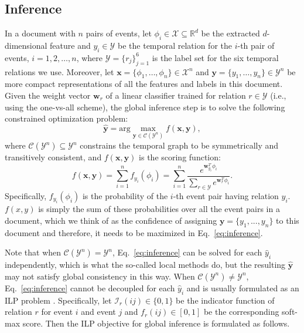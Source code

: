 \documentclass[11pt,letterpaper]{article}
\newcommand\mbf[1]{\mathbf{#1}}
\newcommand\argmax[2]{\textrm{arg}\max_{#1}{#2}}
\newcommand{\calx}{\mathcal{X}}
\newcommand{\caly}{\mathcal{Y}}
\newcommand{\real}{\mathbb{R}}
\newcommand{\ignore}[1]{}
\newcommand{\final}[1]{#1}
\begin{document}
\subsection{Inference}
\label{sec:inference}
In a document with $n$ pairs of events, let $\phi_i\in\calx\subseteq\real^d$ be the extracted $d$-dimensional feature and $y_i\in\caly$ be the temporal relation for the $i$-th pair of events, $i=1,2,\dots,n$, where $\caly=\{r_j\}_{j=1}^6$ is the label set for the six temporal relations we use.
Moreover, let $\mbf{x}=\{\phi_1,\dots,\phi_n\}\in\calx^n$ and $\mbf{y}=\{y_1,\dots,y_n\}\in\caly^n$ be more compact representations of all the features and labels in this document.
Given the weight vector $\mbf{w}_r$ of a linear classifier trained for relation $r\in\mathcal{Y}$ (i.e., using the one-vs-all scheme), the global inference step is to solve the following constrained optimization problem:
\begin{equation}
\hat{\mbf{y}} = \argmax{\mbf{y}\in\mathcal{C}(\caly^n)}{f(\mbf{x},\mbf{y})},
\label{eq:inference}
\end{equation}
where $\mathcal{C}(\caly^n)\subseteq \caly^n$ constrains the temporal graph to be symmetrically and transitively consistent, and $f(\mbf{x},\mbf{y})$ is the scoring function:
$$
f(\mbf{x},\mbf{y}) = \sum_{i=1}^n{f_{y_i}(\phi_i)}=\sum_{i=1}^n{\frac{e^{\mbf{w}_{y_i}^T\phi_i}}{\sum_{r\in\caly}{e^{\mbf{w}_{r}^T\phi_i}}}}.
$$
\final{Specifically, $f_{y_i}(\phi_i)$ is the probability of the $i$-th event pair having relation $y_i$. $f(x,y)$ is simply the sum of these probabilities over all the event pairs in a document, which we think of as the confidence of assigning $\mbf{y}=\{y_1,...,y_n\}$ to this document and therefore, it needs to be maximized in Eq.~\eqref{eq:inference}.}

Note that when $\mathcal{C}(\caly^n) = \caly^n$, Eq.~\eqref{eq:inference} can be solved for each $\hat{y}_i$ independently, which is what the so-called local methods do, \final{but the resulting $\hat{\mbf{y}}$ may not satisfy global consistency in this way.}
\final{When $\mathcal{C}(\caly^n) \ne \caly^n$, Eq.~\eqref{eq:inference} cannot be decoupled for each $\hat{y}_i$} and is usually formulated as an ILP problem \citep{RothYi04,ChambersJu08,DoLuRo12}.
Specifically, let $\mathcal{I}_r(ij)\in\{0,1\}$ be the indicator function of relation $r$ for event $i$ and event $j$ and $f_r(ij)\in[0,1]$ be the corresponding soft-max score.
Then the ILP objective for global inference is formulated as follows.
\ignore{
\begin{argmaxi}
    {\mathcal{I}}{\sum_{ij\in\mathcal{E}}\sum_{r\in\caly} f_r(ij) \mathcal{I}_r(ij)}
    {}{}
    \addConstraint{\sum_{r}{\mathcal{I}_r(ij)} = 1}{}
    \addConstraint{\mathcal{I}_r(ij) = \mathcal{I}_{\bar{r}}(ji)}{}
    \addConstraint{\mathcal{I}_{r_1}(ij)+\mathcal{I}_{r_2}(jk)-\sum_{m=1}^N \mathcal{I}_{r_{3}^m}(ik)\le 1}{}
\end{argmaxi}}
\end{document}
